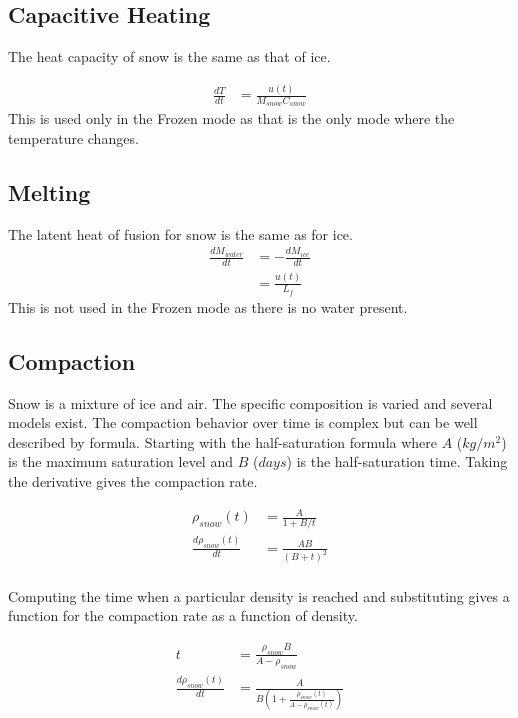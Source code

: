 \documentclass{article}
\begin{document}
\subsection{Capacitive Heating}

The heat capacity of snow is the same as that of ice.

\begin{align}
\frac{dT}{dt} &= \frac{u(t)}{M_{snow} C_{snow}}
\label{eqn:heat-capacitance}
\end{align}
This is used only in the Frozen mode as that is
the only mode where the temperature changes.

\subsection{Melting}

The latent heat of fusion for snow is the same as for ice.
\begin{align}
\frac{dM_{water}}{dt} &= -\frac{dM_{ice}}{dt} \\
  &= \frac{u(t)}{L_f}
  \label{eqn:heat-latency}
\end{align}
This is not used in the Frozen mode as there is no water present.

\subsection{Compaction}

Snow is a mixture of ice and air.
The specific composition is varied and several models exist.
The compaction behavior over time is complex but can
be well described by formula.
Starting with the half-saturation formula where $A$ ($kg/m^2$) is the
maximum saturation level and $B$ ($days$) is the
half-saturation time.
Taking the derivative gives the compaction rate.

\begin{align}
\rho_{snow}(t) &= \frac{A}{1 + B/t} \\
\frac{d\rho_{snow}(t)}{dt} &= \frac{A B}{(B + t)^2} \\
\end{align}

Computing the time when a particular density is reached and
substituting gives a function for the compaction rate
as a function of density.

\begin{align}
t &= \frac{\rho_{snow} B}{A - \rho_{snow}} \\
\frac{d\rho_{snow}(t)}{dt}
    &= \frac{A}{B (1 + \frac{\rho_{snow}(t)}{A - \rho_{snow}(t)}) }
    \label{eqn:compaction}
\end{align}
\end{document}
